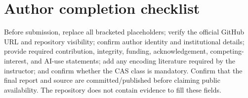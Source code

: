\IfFileExists{cas-sc.cls}{\documentclass[a4paper,fleqn]{cas-sc}}{\documentclass[a4paper,11pt]{article}}
\begin{document}
\appendix
\section{Author completion checklist}
Before submission, replace all bracketed placeholders; verify the official GitHub URL and repository visibility; confirm author identity and institutional details; provide required contribution, integrity, funding, acknowledgement, competing-interest, and AI-use statements; add any encoding literature required by the instructor; and confirm whether the CAS class is mandatory. Confirm that the final report and source are committed/published before claiming public availability. The repository does not contain evidence to fill these fields.
\end{document}
